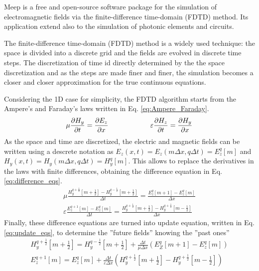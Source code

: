 Meep is a free and open-source software package for the simulation of electromagnetic fields via the finite-difference time-domain (FDTD) method.
Its application extend also to the simulation of photonic elements and circuits.  

The finite-difference time-domain (FDTD) method is a widely used technique: the space is divided into a discrete grid and the fields are evolved in discrete time steps.
The discretization of time id directly determined by the the space discretization and as the steps are made finer and finer, the simulation becomes a closer and closer approximation for the true continuous equations.

Considering the 1D case for simplicity, the FDTD algorithm starts from the Ampere's and Faraday's laws written in Eq. \ref*{eq:Ampere_Faraday}.
\begin{equation} \label{eq:Ampere_Faraday}
    \mu \pdv{H_y}{t} = \pdv{E_z}{x} \qquad\qquad\qquad \varepsilon \pdv{H_z}{t} = \pdv{H_y}{x}
\end{equation}
As the space and time are discretized, the electric and magnetic fields can be written using a descrete notation as \(E_z(x, t) = E_z (m\Delta x, q \Delta t) = E_z^q[m]\) and \(H_y(x, t) = H_y(m\Delta x, q \Delta t) = H_y^q[m]\). This allows to replace the derivatives in the laws with finite differences, obtaining the difference equation in Eq. \ref*{eq:difference_eqs}.
\begin{align}\label{eq:difference_eqs}
    \mu \frac{H_y^{q+\frac{1}{2}}[m+\frac{1}{2}] - H_y^{q-\frac{1}{2}}[m+\frac{1}{2}]}{\Delta t} = \frac{E_z^q[m+1] - E_z^q[m]}{\Delta x}
    \\
    \varepsilon\frac{E_z^{q+1}[m] - E_z^q[m]}{\Delta t} = \frac{H_y^{q+\frac{1}{2}}[m+\frac{1}{2}] - H_y^{q+\frac{1}{2}}[m-\frac{1}{2}]}{\Delta x}
\end{align}
Finally, these difference equations are turned into update equation, written in Eq. \ref*{eq:update_eqs}, to determine the ''future fields'' knowing the ''past ones''
\begin{align}\label{eq:update_eqs}
    H_y^{q+\frac{1}{2}} \left[ m+\frac{1}{2} \right] = H_y^{q-\frac{1}{2}} \left[ m+\frac{1}{2} \right] + \frac{\Delta t}{\mu \Delta x} \left( E_Z^q[m+1] - E_z^q[m] \right)
    \\
    E_z^{q+1} [m] = E_z^q[m] + \frac{\Delta t}{\varepsilon \Delta x} \left( H_y^{q+\frac{1}{2}}\left[ m+\frac{1}{2} \right] - H_y^{q+\frac{1}{2}}\left[ m-\frac{1}{2} \right] \right)
\end{align}

